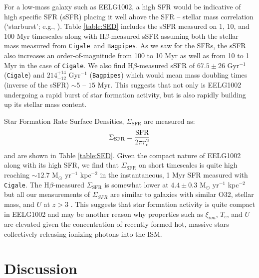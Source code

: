 \documentclass[twocolumn,tight,times,linenumbers]{aastex631}
\newcommand{\hbeta}{H$\beta$}
\newcommand{\xiion}{$\xi_{ion}$}
\newcommand{\cigale}{\texttt{Cigale}}
\newcommand{\bagpipes}{\texttt{Bagpipes}}
\begin{document}
		For a low-mass galaxy such as EELG1002, a high SFR would be indicative of high specific SFR (sSFR)  placing it well above the SFR -- stellar mass correlation (`starburst'; e.g., \citealt{Speagle2014}). Table \ref{table:SED} includes the sSFR measured on 1, 10, and 100 Myr timescales along with \hbeta-measured sSFR assuming both the stellar mass measured from \cigale~and \bagpipes. As we saw for the SFRs, the sSFR also increases an order-of-magnitude from 100 to 10 Myr as well as from 10 to 1 Myr in the case of \cigale. We also find \hbeta-measured sSFR of $67.5\pm26$ Gyr$^{-1}$ (\cigale) and $214^{+14}_{-12}$ Gyr$^{-1}$ (\bagpipes) which would mean mass doubling times (inverse of the sSFR) $\sim  5$ -- $15$ Myr. This suggests that not only is EELG1002 undergoing a rapid burst of star formation activity, but is also rapidly building up its stellar mass content. 
		
		Star Formation Rate Surface Densities, $\Sigma_\textrm{SFR}$ are measured as:
		\begin{equation}
			\centering
			\Sigma_\textrm{SFR} = \frac{\textrm{SFR}}{2 \pi r_e^2}
			\label{eqn:sigma_SFR}
		\end{equation}
		and are shown in Table \ref{table:SED}. Given the compact nature of EELG1002 along with its high SFR, we find that $\Sigma_\textrm{SFR}$ on short timescales is quite high reaching $\sim 12.7$ M$_\odot$ yr$^{-1}$ kpc$^{-2}$ in the instantaneous, 1 Myr SFR measured with \cigale. The \hbeta-measured $\Sigma_\textrm{SFR}$ is somewhat lower at $4.4\pm0.3$ M$_\odot$ yr$^{-1}$ kpc$^{-2}$ but all our measurements of $\Sigma_{SFR}$ are similar to galaxies with similar O32, stellar mass, and $U$ at $z > 3$ \citep{Reddy2023}. This suggests that star formation activity is quite compact in EELG1002 and may be another reason why properties such as \xiion, $T_e$, and $U$ are elevated given the concentration of recently formed hot, massive stars collectively releasing ionizing photons into the ISM.
		
			



		\section{Discussion}
            \label{sec:discussion}
		
\end{document}
